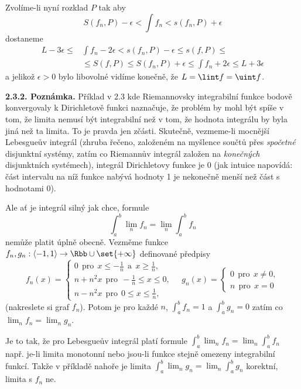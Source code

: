 \documentclass[12pt]{article}
\begin{document}
  Zvolíme-li nyní rozklad $P$ tak aby
  $$
  S(f_n,P)-\epsilon<\int f_n<s(f_n,P)+\epsilon
  $$
 dostaneme
  $$
  \begin{aligned}
  L-3\epsilon\leq &\int f_n-2\epsilon< s(f_n,P)-\epsilon\leq s(f,P)\leq\\
  &\leq S(f,P)\leq S(f_n,P)+\epsilon\leq \int f_n+2\epsilon\leq L+3\epsilon
  \end{aligned}
  $$
 a jelikož $\epsilon>0$ bylo libovolné vidíme konečně, že $L=\lint f=\uint f$.\sq
	
	\bigskip
	
	{\bf 2.3.2. Poznámka.} Příklad v 2.3 kde Riemannovsky integrabilní funkce bodově konvergovaly k Dirichletově funkci naznačuje, že problém by mohl být spíše v tom, že limita nemusí být integrabilní než v tom, že hodnota integrálu by byla jiná než ta limita. To je pravda jen zčásti. Skutečně, vezmeme-li mocnější Lebesgueův integrál (zhruba  řečeno, založeném na myšlence sou\v ctů přes {\em spočetné} disjunktní systémy, zatím co Riemannův  integrál založen na {\em konečných} disjunktních systémech), integrál Dirichletovy funkce je 0 (jak intuice napovídá: část intervalu na níž funkce nabývá hodnoty 1 je nekonečně menší než část s hodnotami 0). 
	
	Ale ať je integrál silný jak chce, formule
	$$\int_a^b\lim_nf_n=\lim_n\int_a^bf_n$$ nemůže platit úplně obecně. Vezměme funkce $f_n,g_n:\langle-1,1\rangle\to \Rbb\cup\set{+\infty}$ definované předpisy
	$$
	f_n(x)=\begin{cases}0\ \ \text{pro}\ \  x\leq -\frac{1}{n}\ \ \text{a}\ \ x\geq \frac{1}{n},\\
	                    n+n^2x\ \  \text{pro} \ \ -\frac{1}{n}\leq x\leq 0,\\ 
											n-n^2x\ \ \text{pro} \ \ 0\leq x\leq\frac{1}{n},
											\end{cases}											
											\quad
g_n(x)=\begin{cases}0\ \ \text{pro}\ \ x\neq 0,\\
	                    n\ \ \text{pro} \ \ x= 0	
																					\end{cases}
$$
(nakreslete si graf $f_n$).  Potom je pro každé $n$,  $\int_a^bf_n=1$ a $\int_a^bg_n=0$ zatím co $\lim_nf_n=\lim_ng_n$.	

Je to tak, že pro Lebesgueův  integrál platí formule $\int_a^b\lim_nf_n=\lim_n\int_a^bf_n$ např. je-li limita monotonní nebo jsou-li funkce stejně omezeny integrabilní funkcí. Takže v příkladě nahoře je limita $\int_a^b\lim_ng_n=\lim_n\int_a^bg_n$	korektní, limita s $f_n$ ne.	
\end{document}

